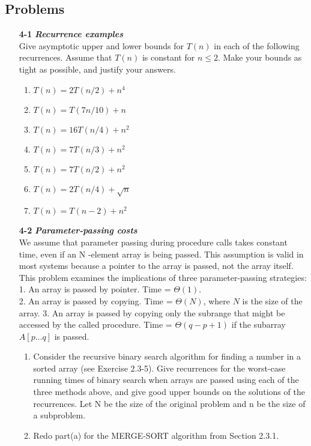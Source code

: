 \documentclass[fontsize=12pt,paper=a4]{book}
\begin{document}
\subsection*{Problems}
\begin{enumerate}
 \item[\textbf{4-1}]
       \textbf{\textit{Recurrence examples}}\\
       Give asymptotic upper and lower bounds for $T(n)$ in each of the following recurrences. Assume that $T(n)$ is constant for $n \leq 2$. Make your bounds as tight as possible, and justify your answers.
       \begin{enumerate}
        \item $T(n) = 2T(n/2) + n^4$
        \item $T(n) = T(7n/10) + n$
        \item $T(n) = 16T(n/4) + n^2$
        \item $T(n) = 7T(n/3) + n^2$
        \item $T(n) = 7T(n/2) + n^2$
        \item $T(n) = 2T(n/4) + \sqrt{n}$
        \item $T(n) = T(n-2) + n^2$
       \end{enumerate}
       
 \item[\textbf{4-2}]
       \textbf{\textit{Parameter-passing costs}}\\
       We assume that parameter passing during procedure calls takes constant time, even if an N -element array is being passed. This assumption is valid in most systems because a pointer to the array is passed, not the array itself. This problem examines the implications of three parameter-passing strategies:\\
       1. An array is passed by pointer. Time = $\Theta(1)$.\\
       2. An array is passed by copying. Time = $\Theta(N)$, where $N$ is the size of the array.
       3. An array is passed by copying only the subrange that might be accessed by the
       called procedure. Time = $\Theta(q - p + 1)$ if the subarray $A[p \dots q]$ is passed.
       \begin{enumerate}
        \item Consider the recursive binary search algorithm for finding a number in a sorted array (see Exercise 2.3-5). Give recurrences for the worst-case running times
              of binary search when arrays are passed using each of the three methods above, and give good upper bounds on the solutions of the recurrences. Let N be the size of the original problem and n be the size of a subproblem.
        \item Redo part(a) for the MERGE-SORT algorithm from Section 2.3.1.
       \end{enumerate}
       

\end{enumerate}
\end{document}
